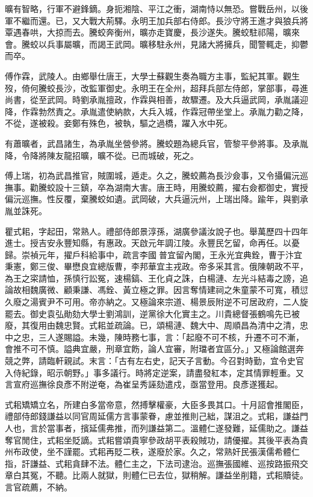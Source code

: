 \begin{pinyinscope}
曠有智略，行軍不避鋒鏑。身扼湘陰、平江之衝，湖南恃以無恐。嘗戰岳州，以後軍不繼而還。已，又大戰大荊驛。永明王加兵部右侍郎。長沙守將王進才與狼兵將覃遇春哄，大掠而去。騰蛟奔衡州，曠亦走寶慶，長沙遂失。騰蛟駐祁陽，曠來會。騰蛟以兵事屬曠，而謁王武岡。曠移駐永州，見諸大將擁兵，聞警輒走，抑鬱而卒。

傅作霖，武陵人。由鄉舉仕唐王，大學士蘇觀生奏為職方主事，監紀其軍。觀生歿，倚何騰蛟長沙，改監軍御史。永明王在全州，超拜兵部左侍郎，掌部事，尋進尚書，從至武岡。時劉承胤擅政，作霖與相善，故驟遷。及大兵逼武岡，承胤議迎降，作霖勃然責之。承胤遣使納款，大兵入城，作霖冠帶坐堂上。承胤力勸之降，不從，遂被殺。妾鄭有殊色，被執，驅之過橋，躍入水中死。

有蕭曠者，武昌諸生，為承胤坐營參將。騰蛟題為總兵官，管黎平參將事。及承胤降，令降將陳友龍招曠，曠不從。已而城破，死之。

傅上瑞，初為武昌推官，賊圍城，遁走。久之，騰蛟薦為長沙僉事，又令攝偏沅巡撫事。勸騰蛟設十三鎮，卒為湖南大害。唐王時，用騰蛟薦，擢右僉都御史，實授偏沅巡撫。性反覆，棄騰蛟如遺。武岡破，大兵逼沅州，上瑞出降。踰年，與劉承胤並誅死。

瞿式耜，字起田，常熟人。禮部侍郎景淳孫，湖廣參議汝說子也。舉萬歷四十四年進士。授吉安永豐知縣，有惠政。天啟元年調江陵。永豐民乞留，命再任。以憂歸。崇禎元年，擢戶科給事中，疏言李國普宜留內閣，王永光宜典銓，曹于汴宜秉憲，鄭三俊、畢懋良宜總版曹，李邦華宜主戎政。帝多采其言。俄陳朝政不平，為王之寀請恤，孫慎行訟冤，速楊鎬、王化貞之誅，白楊漣、左光斗結毒之謗，追論故相魏廣微、顧秉謙、馮銓、黃立極之罪。因言奪情建祠之朱童蒙不可寬，積愆久廢之湯賓尹不可用。帝亦納之。又極論來宗道、楊景辰附逆不可居政府，二人旋罷去。御史袁弘勛劾大學士劉鴻訓，逆黨徐大化實主之。川貴總督張鶴鳴先已被廢，其復用由魏忠賢。式耜並疏論。已，頌楊漣、魏大中、周順昌為清中之清，忠中之忠，三人遂賜謚。未幾，陳時務七事，言：「起廢不可不核，升遷不可不漸，會推不可不慎。謚典宜嚴，刑章宜飭，論人宜審，附璫者宜區分。」又極論館選奔競之弊，請臨軒親試。末言：「古有左右史，記天子言動。今召對時勤，宜令史官入侍紀錄，昭示朝野。」事多議行。時將定逆案，請盡發紅本，定其情罪輕重。又言宣府巡撫徐良彥不附逆奄，為崔呈秀誣劾遣戍，亟當登用。良彥遂獲起。

式耜矯矯立名，所建白多當帝意，然搏擊權豪，大臣多畏其口。十月詔會推閣臣，禮部侍郎錢謙益以同官周延儒方言事蒙眷，慮並推則己絀，謀沮之。式耜，謙益門人也，言於當事者，擯延儒弗推，而列謙益第二。溫體仁遂發難，延儒助之。謙益奪官閒住，式耜坐貶謫。式耜嘗頌貴寧參政胡平表殺賊功，請優擢。其後平表為貴州布政使，坐不謹罷。式耜再貶二秩，遂廢於家。久之，常熟奸民張漢儒希體仁指，訐謙益、式耜貪肆不法。體仁主之，下法司逮治。巡撫張國維、巡按路振飛交章白其冤，不聽。比兩人就獄，則體仁已去位，獄稍解。謙益坐削籍，式耜贖徒。言官疏薦，不納。


\end{pinyinscope}

